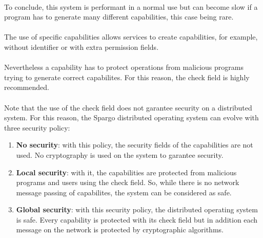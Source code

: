 \documentclass[10pt,a4wide]{article}
\begin{document}
\begin{multicols}{2}
\paragraph{}

To conclude, this system is performant in a normal use but can become
slow if a program has to generate many different capabilities, this case
being rare.

\paragraph{}

The use of specific capabilities allows services to create capabilities,
for example, without identifier or with extra permission fields.

\paragraph{}

Nevertheless a capability has to protect operations from malicious programs
trying to generate correct capabilites. For this reason, the check field is
highly recommended.

\paragraph{}

Note that the use of the check field does not garantee security on a
distributed system. For this reason, the Spargo distributed operating
system can evolve with three security policy:

\begin{enumerate}

\item \textbf{No security}: with this policy, the security fields of the
      capabilities are not used. No cryptography is used on the system
      to garantee security.

\item \textbf{Local security}: with it, the capabilities are protected from
      malicious programs and users using the check field. So, while there
      is no network message passing of capabilites, the system can be
      considered as safe.

\item \textbf{Global security}: with this security policy, the distributed
      operating system is safe. Every capability is protected with its check
      field but in addition each message on the network is protected by
      cryptographic algorithms.


\end{enumerate}
\end{multicols}
\end{document}
